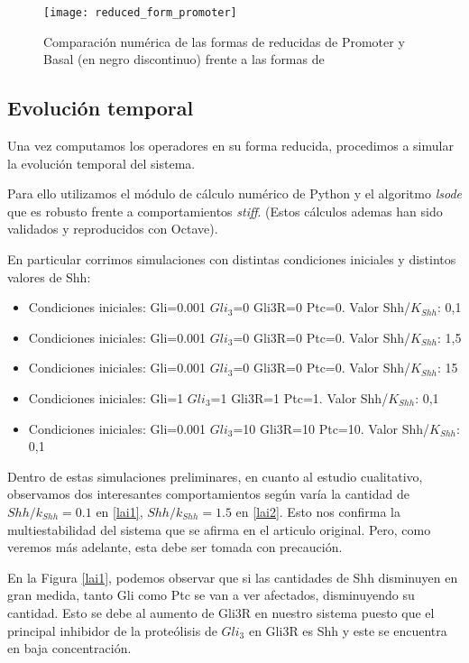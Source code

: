 \begin{figure}[h]
	\texttt{[image: reduced\_form\_promoter]}
	\centering
	\caption{Comparación numérica de las formas de reducidas de Promoter y Basal (en negro discontinuo) frente a las formas de \cite{schaffer} }
	\label{compara}
\end{figure}

\subsection{Evolución temporal}
Una vez computamos los operadores en su forma reducida, procedimos a simular la evolución temporal del sistema. 

Para ello utilizamos el módulo de cálculo numérico de Python y el algoritmo \textit{lsode} que es robusto frente a comportamientos \textit{stiff}. (Estos cálculos ademas han sido validados y reproducidos con Octave).

En particular corrimos simulaciones con distintas condiciones iniciales y distintos valores de Shh:

\begin{itemize}
	\item Condiciones iniciales: Gli=0.001 $Gli_3$=0 Gli3R=0 Ptc=0.  Valor Shh/$K_{Shh}$: 0,1
	\item Condiciones iniciales: Gli=0.001 $Gli_3$=0 Gli3R=0 Ptc=0.  Valor Shh/$K_{Shh}$: 1,5
	\item Condiciones iniciales: Gli=0.001 $Gli_3$=0 Gli3R=0 Ptc=0.  Valor Shh/$K_{Shh}$: 15
	\item Condiciones iniciales: Gli=1 $Gli_3$=1 Gli3R=1 Ptc=1.  Valor Shh/$K_{Shh}$: 0,1
	\item Condiciones iniciales: Gli=0.001 $Gli_3$=10 Gli3R=10 Ptc=10.  Valor Shh/$K_{Shh}$: 0,1
\end{itemize}

Dentro de estas simulaciones preliminares, en cuanto al estudio cualitativo, observamos dos interesantes comportamientos según varía la cantidad de $Shh/k_{Shh}=0.1$ en \ref{lai1}, $Shh/k_{Shh}=1.5$ en \ref{lai2}. Esto nos confirma la multiestabilidad del sistema que se afirma en el articulo original. Pero, como veremos más adelante, esta debe ser tomada con precaución.

En la Figura \ref{lai1}, podemos observar que si las cantidades de Shh disminuyen en gran medida, tanto Gli como Ptc se van a ver afectados, disminuyendo su cantidad. Esto se debe al aumento de Gli3R en nuestro sistema puesto que el principal inhibidor de la proteólisis de $Gli_3$ en Gli3R es Shh y este se encuentra en baja concentración. 

